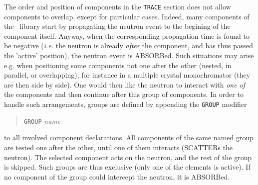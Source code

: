 {The order and position of components in the \texttt{TRACE} section does not
allow components to overlap, except for particular cases.
Indeed, many components of the \MCS\ library  start
by propagating the neutron event to the begining of the component itself.
Anyway, when the corresponding propagation time is found to be negative
({\it i.e.} the neutron is already \emph{after} the component, and has thus
passed the 'active' position), the neutron event is ABSORBed. Such situations
may arise e.g. when positioning some components not one after the other (nested, in parallel, or overlapping), for
instance in a multiple crystal monochromator (they are then side by side). One
would then like the neutron to interact with \emph{one of} the components and
then continue after this group of components. In order to handle such
arrangements, groups are defined by appending the \texttt{GROUP} modifier
\begin{quote}
  \texttt{GROUP} \textit{name}
\end{quote}
to all involved component declarations. 
All components of the same named group are tested one after the other, until one of them interacts (SCATTERs  the neutron). The selected component acts on the neutron, and the rest of the group is skipped. Such groups are thus exclusive (only one of the elements is active).
If no component of the group could intercept the neutron, it is ABSORBed.

}

